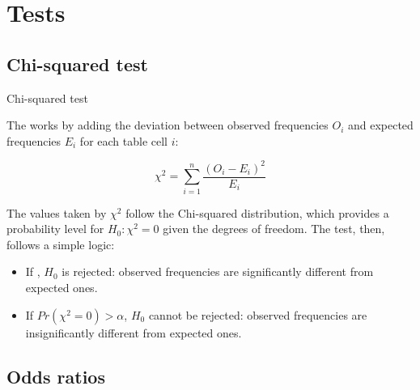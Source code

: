\documentclass[t]{beamer}
\begin{document}
	\section{Tests}
	
	\subsection{Chi-squared test}

	\begin{frame}[t]{Chi-squared test}
	
	The  works by adding the deviation between observed frequencies $O_i$ and expected frequencies $E_i$ for each table cell $i$:
	
	$$\chi^2=\sum_{i=1}^{n} \frac{(O_i - E_i)^2}{E_i}$$	
	
	The values taken by $\chi^2$ follow the Chi-squared distribution, which provides a probability level for $H_0: \chi^2=0$ given the degrees of freedom. The test, then, follows a simple logic:
	
	\begin{itemize}
		\item If , $H_0$ is rejected: observed frequencies are significantly different from expected ones.
		\item If $Pr(\chi^2=0) > \alpha$, $H_0$ cannot be rejected: observed frequencies are insignificantly different from expected ones.
	\end{itemize}
	
	\end{frame}
	

	\subsection{Odds ratios}
\end{document}
